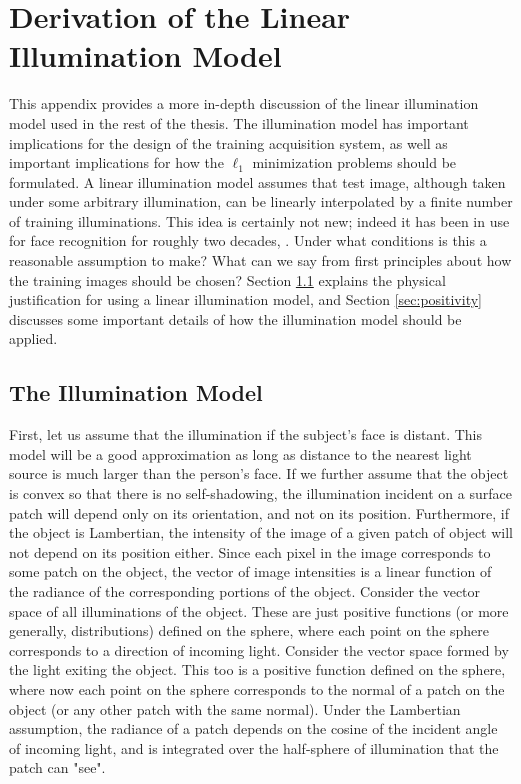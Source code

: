 \section{Derivation of the Linear Illumination Model}
\label{sec:appendix_illumination}

This appendix provides a more in-depth discussion of the linear illumination
model used in the rest of the thesis.  The illumination model has important
implications for the design of the training acquisition system, as well
as important implications for how the $\ell_1$ minimization problems should
be formulated.
A linear illumination model assumes that test image, although taken under some
arbitrary illumination, can be linearly interpolated by a finite number of
training illuminations.  This idea is certainly not new; indeed it has been in
use for face recognition for roughly two decades, \cite{Turk1991-CVPR}.  Under
what conditions is this a reasonable assumption to make?  What can we say from
first principles about how the training images should be chosen?  
Section \ref{sec:illumination_derivation} explains the physical justification
for using a linear illumination model, and Section \ref{sec:positivity}
discusses some important details of how the illumination model should be 
applied.

\subsection{The Illumination Model}
\label{sec:illumination_derivation}
%
First, let us assume that the illumination if the subject's face is distant.
This model will be a good approximation as long as distance to the nearest
light source is much larger than the person's face.  If we further assume that
the object is convex so that there is no self-shadowing, the illumination
incident on a surface patch will depend only on its orientation, and not on its
position.  Furthermore, if the object is Lambertian, the intensity of the image
of a given patch of object will not depend on its position either.  Since each
pixel in the image corresponds to some patch on the object, the vector of image
intensities is a linear function of the radiance of the corresponding portions
of the object.  Consider the vector space of all illuminations of the object.
These are just positive functions (or more generally, distributions) defined on
the sphere, where each point on the sphere corresponds to a direction of
incoming light.  Consider the vector space formed by the light exiting the
object.  This too is a positive function defined on the sphere, where now each
point on the sphere corresponds to the normal of a patch on the object (or any
other patch with the same normal).  Under the Lambertian assumption, the
radiance of a patch depends on the cosine of the incident angle of incoming
light, and is integrated over the half-sphere of illumination that the patch
can "see".

